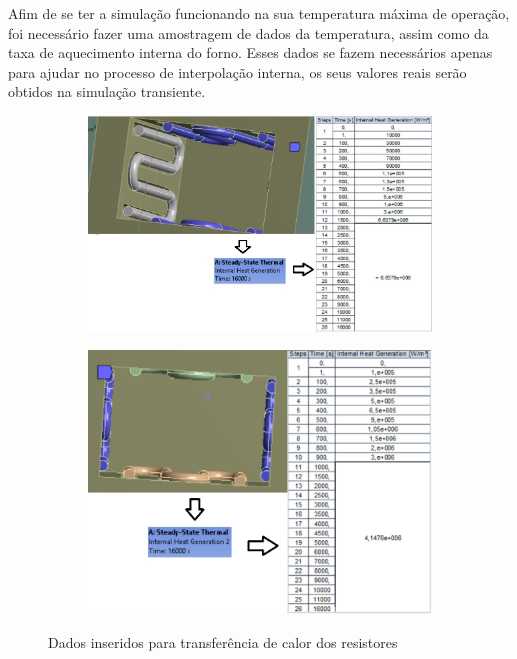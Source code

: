 Afim de se ter a simulação funcionando na sua temperatura máxima de operação, foi
necessário fazer uma amostragem de dados da temperatura, assim como da taxa de aquecimento
interna do forno. Esses dados se fazem necessários apenas para ajudar no processo de interpolação
interna, os seus valores reais serão obtidos na simulação transiente.
\begin{figure}[H]
\centering
    \begin{subfigure}{0.49\linewidth} \centering
        \includegraphics[scale=0.5]{figuras/ansys2.jpg}
        \label{ansys2}
    \end{subfigure}
    \begin{subfigure}{0.49\linewidth} \centering
        \includegraphics[scale=0.5]{figuras/ansys3.jpg}
        \label{ansys3}
    \end{subfigure}
    \caption{Dados inseridos para transferência de calor dos resistores}
\end{figure}

